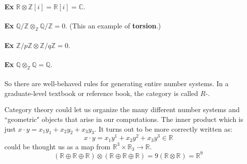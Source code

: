 \documentclass[12pt]{article}
\begin{document}
{\textbf{Ex} $\mathbb{R} \otimes \mathbb{Z}[i] = \mathbb{R}[i] = \mathbb{C}$. \\ \\
\textbf{Ex} $\mathbb{Q}/\mathbb{Z} \otimes_\mathbb{Z} \mathbb{Q}/\mathbb{Z} = 0$. (This an example of \textbf{torsion}.)\\ \\
\textbf{Ex} $\mathbb{Z}/p\mathbb{Z} \otimes \mathbb{Z}/q\mathbb{Z} = 0$. \\ \\
\textbf{Ex} $\mathbb{Q} \otimes_{\mathbb{Z}} \mathbb{Q} = \mathbb{Q}$. \\ \\
So there are well-behaved rules for generating entire number systems.  In a graduate-level textbook or reference book, the category is called $R$-.

\newpage

\noindent Category theory could let us organize the many different number systems and ``geometric" objects that arise in our computations.  The inner product which is just $x\cdot y = x_1 y_1 + x_2 y_2 + x_3 y_3$.  It turns out to be more correctly written as:
$$ x \cdot y = x_1 y^1 + x_2 y^2 + x_3 y^3 \in \mathbb{R} $$ could be thought us as a map from $\mathbb{R}^3 \times \mathbb{R}_3 \to \mathbb{R}$.   
$$ (\mathbb{R} \oplus \mathbb{R} \oplus \mathbb{R}) \otimes
( \mathbb{R} \oplus \mathbb{R} \oplus \mathbb{R})  = 9 (\mathbb{R} \otimes \mathbb{R}) = \mathbb{R}^9 $$ \\ \\

}
\end{document}
